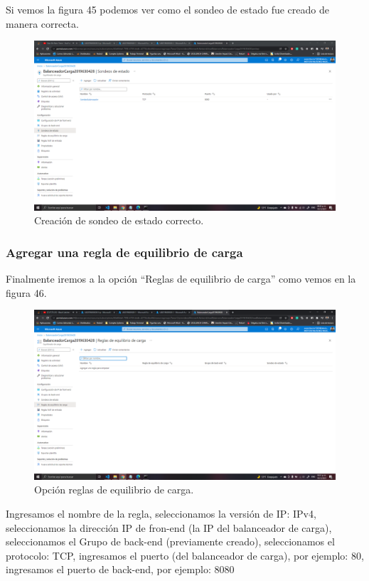\documentclass[11pt]{article}
\begin{document}
			Si vemos la figura 45 podemos ver como el sondeo de estado fue creado de manera correcta.
			\begin{figure}[H]
				\centering
				\includegraphics[scale=0.34]{resources/sondeoBalanceadorF.png}
				\caption{Creación de sondeo de estado correcto.}\label{fig:picture}
			\end{figure}
			\subsubsection{Agregar una regla de equilibrio de carga}
			Finalmente iremos a la opción ``Reglas de equilibrio de carga'' como vemos en la figura 46.
			\begin{figure}[H]
				\centering
				\includegraphics[scale=0.34]{resources/reglaBalanceador1-3.png}
				\caption{Opción reglas de equilibrio de carga.}\label{fig:picture}
			\end{figure}
			Ingresamos el nombre de la regla, seleccionamos la versión de IP: IPv4, seleccionamos la dirección IP de fron-end (la IP del balanceador de carga), seleccionamos el Grupo de back-end (previamente creado), seleccionamos el protocolo: TCP, ingresamos el puerto (del balanceador de carga), por ejemplo: 80, ingresamos el puerto de back-end, por ejemplo: 8080
\end{document}
